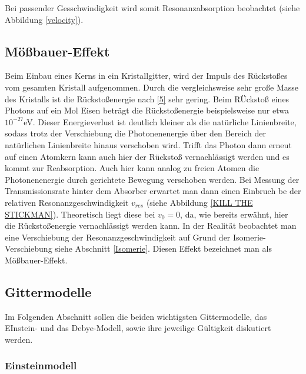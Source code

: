 Bei passender Gesschwindigkeit wird somit Resonanzabsorption beobachtet (siehe Abbildung \ref{velocity}).


\subsection{ Mößbauer-Effekt}

Beim Einbau eines Kerns in ein Kristallgitter, wird der Impuls des Rückstoßes vom gesamten Kristall aufgenommen. Durch die vergleichsweise sehr große Masse des Kristalls ist die Rückstoßenergie nach \ref{5} sehr gering. Beim RÜckstoß eines Photons auf ein Mol Eisen beträgt die Rückstoßenergie beispielsweise nur etwa $10^{-27}$eV. Dieser Energieverlust ist deutlich kleiner als die natürliche Linienbreite, sodass trotz der Verschiebung die Photonenenergie über den Bereich der natürlichen Linienbreite hinaus verschoben wird. Trifft das Photon dann erneut auf einen Atomkern kann auch hier der Rückstoß vernachlässigt werden und es kommt zur Reabsorption. 
Auch hier kann analog zu freien Atomen die Photonenenergie durch gerichtete Bewegung verschoben werden. Bei Messung der Transmissionsrate hinter dem Absorber erwartet man dann einen Einbruch be der relativen Resonanzgeschwindigkeit $v_{res}$ (siehe Abbildung \ref{KILL THE STICKMAN}). Theoretisch liegt diese bei $v_0=0$, da, wie bereits erwähnt, hier die Rückstoßenergie vernachlässigt werden kann. In der Realität beobachtet man eine Verschiebung der Resonanzgeschwindigkeit auf Grund der Isomerie-Verschiebung siehe Abschnitt \ref{Isomerie}.  
Diesen Effekt bezeichnet man als Mößbauer-Effekt.


\subsection{Gittermodelle}

Im Folgenden Abschnitt sollen die beiden wichtigsten Gittermodelle, das EInstein- und das Debye-Modell, sowie ihre jeweilige Gültigkeit diskutiert werden.

\subsubsection{Einsteinmodell}

